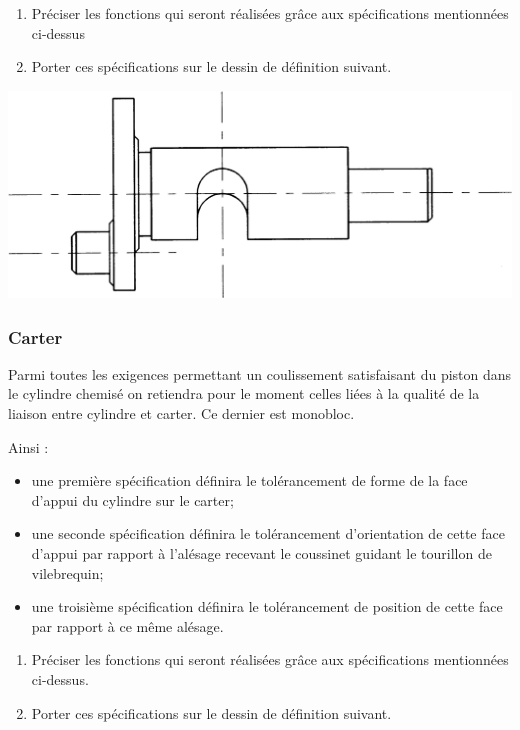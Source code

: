 \documentclass[11pt,oneside]{article}
\begin{document}
\begin{enumerate}
\item Préciser les fonctions qui seront réalisées grâce aux spécifications mentionnées ci-dessus
\item Porter ces spécifications sur le dessin de définition suivant.
\end{enumerate}

\begin{center}
\includegraphics[width=.8\textwidth]{png/vilebrequin2}
\end{center}

\newpage
\subsubsection{Carter}
Parmi toutes les exigences permettant un coulissement satisfaisant du piston dans le cylindre chemisé on retiendra pour le moment celles liées à la qualité de la liaison entre cylindre et carter. Ce dernier est monobloc.

Ainsi :
\begin{itemize}
\item une première spécification définira le tolérancement de forme de la face d’appui du cylindre sur le carter;
\item une seconde spécification définira le tolérancement d’orientation de cette face d’appui par rapport à l’alésage recevant le coussinet guidant le tourillon de vilebrequin;
\item une troisième spécification définira le tolérancement de position de cette face par rapport à ce même alésage.
\end{itemize}

\begin{enumerate}
\item Préciser les fonctions qui seront réalisées grâce aux spécifications mentionnées ci-dessus.
\item Porter ces spécifications sur le dessin de définition suivant.
\end{enumerate}
\end{document}
